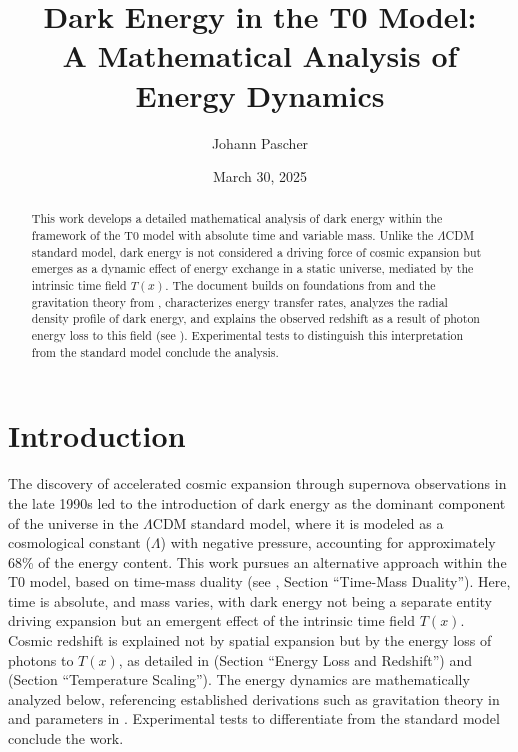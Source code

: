 \documentclass[a4paper,12pt]{article}
\theoremstyle{definition}
\theoremstyle{remark}
\newcommand{\Tfield}{T(x)}
\begin{document}
	
	\title{Dark Energy in the T0 Model: \\A Mathematical Analysis of Energy Dynamics}
	\author{Johann Pascher}
	\date{March 30, 2025}
	\maketitle
	
	\begin{abstract}
		This work develops a detailed mathematical analysis of dark energy within the framework of the T0 model with absolute time and variable mass. Unlike the \(\Lambda\)CDM standard model, dark energy is not considered a driving force of cosmic expansion but emerges as a dynamic effect of energy exchange in a static universe, mediated by the intrinsic time field \(\Tfield\). The document builds on foundations from \cite{pascher_params_2025} and the gravitation theory from \cite{pascher_galaxies_2025}, characterizes energy transfer rates, analyzes the radial density profile of dark energy, and explains the observed redshift as a result of photon energy loss to this field (see \cite{pascher_messdifferenzen_2025}). Experimental tests to distinguish this interpretation from the standard model conclude the analysis.
	\end{abstract}
	
	\tableofcontents
	\newpage
	
	\section{Introduction}
	
	The discovery of accelerated cosmic expansion through supernova observations in the late 1990s led to the introduction of dark energy as the dominant component of the universe in the \(\Lambda\)CDM standard model, where it is modeled as a cosmological constant (\(\Lambda\)) with negative pressure, accounting for approximately 68\% of the energy content. This work pursues an alternative approach within the T0 model, based on time-mass duality (see \cite{pascher_params_2025}, Section “Time-Mass Duality”). Here, time is absolute, and mass varies, with dark energy not being a separate entity driving expansion but an emergent effect of the intrinsic time field \(\Tfield\). Cosmic redshift is explained not by spatial expansion but by the energy loss of photons to \(\Tfield\), as detailed in \cite{pascher_messdifferenzen_2025} (Section “Energy Loss and Redshift”) and \cite{pascher_temp_2025} (Section “Temperature Scaling”). The energy dynamics are mathematically analyzed below, referencing established derivations such as gravitation theory in \cite{pascher_galaxies_2025} and parameters in \cite{pascher_params_2025}. Experimental tests to differentiate from the standard model conclude the work.
	
\end{document}
